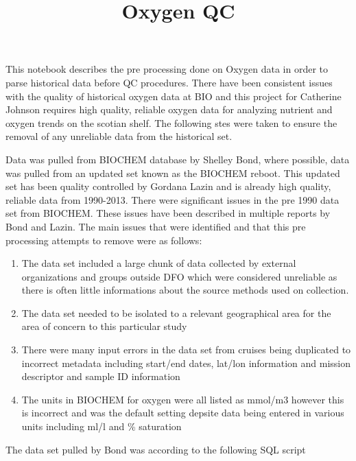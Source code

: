\documentclass[]{article}
\title{Oxygen QC}
\author{}
\date{}
\begin{document}
\maketitle

This notebook describes the pre processing done on Oxygen data in order
to parse historical data before QC procedures. There have been
consistent issues with the quality of historical oxygen data at BIO and
this project for Catherine Johnson requires high quality, reliable
oxygen data for analyzing nutrient and oxygen trends on the scotian
shelf. The following stes were taken to ensure the removal of any
unreliable data from the historical set.

Data was pulled from BIOCHEM database by Shelley Bond, where possible,
data was pulled from an updated set known as the BIOCHEM reboot. This
updated set has been quality controlled by Gordana Lazin and is already
high quality, reliable data from 1990-2013. There were significant
issues in the pre 1990 data set from BIOCHEM. These issues have been
described in multiple reports by Bond and Lazin. The main issues that
were identified and that this pre processing attempts to remove were as
follows:

\begin{enumerate}
\def\labelenumi{\arabic{enumi}.}
\item
  The data set included a large chunk of data collected by external
  organizations and groups outside DFO which were considered unreliable
  as there is often little informations about the source methods used on
  collection.
\item
  The data set needed to be isolated to a relevant geographical area for
  the area of concern to this particular study
\item
  There were many input errors in the data set from cruises being
  duplicated to incorrect metadata including start/end dates, lat/lon
  information and mission descriptor and sample ID information
\item
  The units in BIOCHEM for oxygen were all listed as mmol/m3 however
  this is incorrect and was the default setting depsite data being
  entered in various units including ml/l and \% saturation
\end{enumerate}

The data set pulled by Bond was according to the following SQL script
\end{document}
